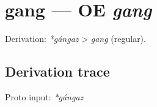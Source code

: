 \documentclass[
  british,
  a4paper,
  openany]{book}
\providecommand{\texorpdfstring}[2]{#1}
\begin{document}
\section{\texorpdfstring{gang --- OE
\emph{gang}}{gang --- OE gang}}\label{gang-oe-gang}


Derivation: \emph{*gángaz} \textgreater{} \emph{gang} (regular).

\subsection{Derivation trace}\label{derivation-trace-20}

Proto input: \emph{*gángaz}

\begingroup
\setlength{\fboxsep}{6pt}
\end{document}

